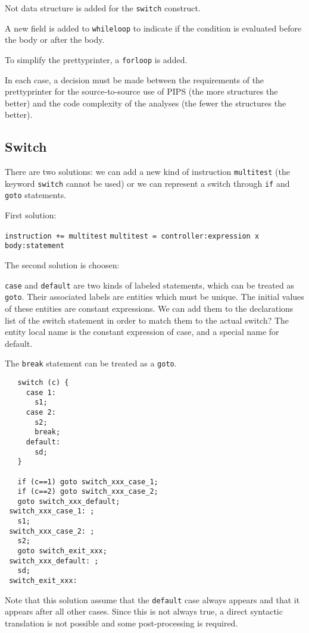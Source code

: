 \documentclass[a4paper]{report}
\begin{document}
Not data structure is added for the \verb/switch/ construct.

A new field is added to \verb/whileloop/ to indicate if the condition
is evaluated before the body or after the body.

To simplify the prettyprinter, a \verb/forloop/ is added.

In each case, a decision must be made between the requirements of the
prettyprinter for the source-to-source use of PIPS (the more
structures the better) and the code complexity of the analyses (the
fewer the structures the better).

\subsection{Switch}

There are two solutions: we can add a new kind of instruction
\verb/multitest/ (the keyword \verb/switch/ cannot be used) or we can
represent a switch through \verb/if/ and \verb/goto/ statements.  

First solution: 

\verb/instruction += multitest/
\verb/multitest = controller:expression x body:statement/

The second solution is choosen: 
 
\verb/case/ and \verb/default/ are two kinds of labeled statements, which
can be treated as \verb/goto/. Their
associated labels are entities which must be unique.  The initial values of these
entities are constant expressions. We can add them to the
declarations list of the switch statement in order to match them to the actual
switch? The entity local name is the constant expression of case, and a
special name for default.  

The \verb/break/ statement can be treated as a \verb/goto/.

\begin{lstlisting}
   switch (c) {
     case 1:
       s1;
     case 2: 
       s2;  
       break;
     default: 
       sd;
   }

   if (c==1) goto switch_xxx_case_1;
   if (c==2) goto switch_xxx_case_2;
   goto switch_xxx_default;
 switch_xxx_case_1: ;
   s1;
 switch_xxx_case_2: ;
   s2;
   goto switch_exit_xxx;
 switch_xxx_default: ;
   sd;      
 switch_exit_xxx:
\end{lstlisting}

Note that this solution assume that the \verb/default/ case always
appears and that it appears after all other cases. Since this is not
always true, a direct syntactic translation is not possible and some
post-processing is required.
\end{document}
